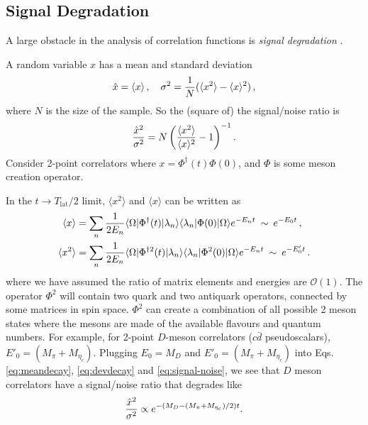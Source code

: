\subsection{Signal Degradation}
\label{sec:signaldegradation}

A large obstacle in the analysis of correlation functions is \textit{signal degradation} \cite{Parisi:1983ae,Lepage:1989hd}.

A random variable $x$ has a mean and standard deviation
\begin{align}
  \hat{x} = \langle x \rangle\,,\quad
  \sigma^2 = {1\over N} ( \langle x^2 \rangle - \langle x \rangle^2 )\,,
\end{align}
where $N$ is the size of the sample. So the (square of) the signal/noise ratio is
\begin{align}
  {\hat{x}^2\over \sigma^2} = N \left( {\langle x^2 \rangle \over \langle x \rangle^2} - 1 \right) ^{-1}.
  \label{eq:signal-noise}
\end{align}
Consider 2-point correlators where $x = \Phi^{\dagger}(t) \Phi(0)$, and $\Phi$ is some meson creation operator.

In the $t\to T_{\text{lat}}/2$ limit, $\langle x^2 \rangle$ and $\langle x \rangle$ can be written as
\begin{align}
  \label{eq:meandecay}
  \langle x \rangle &= \sum_n {1\over 2E_n} \langle \Omega | \Phi^{\dagger}(t) | \lambda_n \rangle \langle \lambda_n | \Phi(0) | \Omega \rangle e^{-E_n t} \,\,\,{\sim}\,\,\, e^{-E_0 t}\,, \\
  \langle x^2 \rangle &= \sum_n {1\over 2E_n} \langle \Omega | \Phi^{\dagger 2}(t) | \lambda_n \rangle \langle \lambda_n | \Phi^2(0) | \Omega \rangle e^{-E_n t} \,\,\,{\sim}\,\,\, e^{-E'_0 t}\,.
  \label{eq:devdecay}
\end{align}
where we have assumed the ratio of matrix elements and energies are $\mathcal{O}(1)$. The operator $\Phi^2$ will contain two quark and two antiquark operators, connected by some matrices in spin space. $\Phi^2$ can create a combination of all possible 2 meson states where the mesons are made of the available flavours and quantum numbers. For example, for 2-point $D$-meson correlators ($c\bar{d}$ pseudoscalars), $E'_0 = (M_{\pi}+M_{\eta_c})$. Plugging $E_0=M_{D}$ and $E'_0=(M_{\pi}+M_{\eta_c})$ into Eqs. \eqref{eq:meandecay}, \eqref{eq:devdecay} and \eqref{eq:signal-noise}, we see that $D$ meson correlators have a signal/noise ratio that degrades like
\begin{align}
  {\hat{x}^2\over \sigma^2} \propto e^{-(M_{D}-(M_{\pi}+M_{\eta_c})/2)t}.
\end{align}

